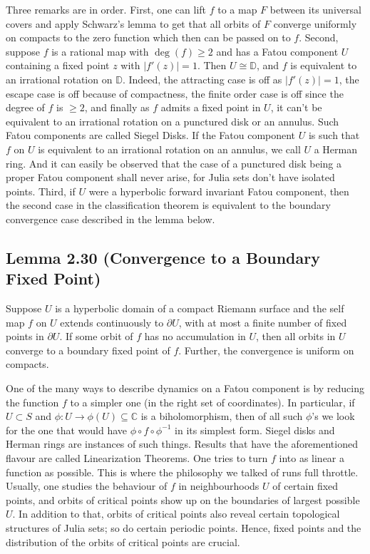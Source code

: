 \documentclass[11pt,a4paper]{article}
\begin{document}
        Three remarks are in order. First, one can lift $f$ to a map $F$ between its universal covers and apply Schwarz's lemma to get that all orbits of $F$ converge uniformly on compacts to the zero function which then can be passed on to $f$. Second, suppose $f$ is a rational map with $\deg(f)\geq2$ and has a Fatou component $U$ containing a fixed point $z$ with $|f'(z)|=1$. Then $U \cong \mathbb{D}$, and $f$ is equivalent to an irrational rotation on $\mathbb{D}$. Indeed, the attracting case is off as $|f'(z)| = 1$, the escape case is off because of compactness, the finite order case is off since the degree of $f$ is $\geq 2$, and finally as $f$ admits a fixed point in $U$, it can't be equivalent to an irrational rotation on a punctured disk or an annulus.
        Such Fatou components are called Siegel Disks. If the Fatou component $U$ is such that $f$ on $U$ is equivalent to an irrational rotation on an annulus, we call $U$ a Herman ring. And it can easily be observed that the case of a punctured disk being a proper Fatou component shall never arise, for Julia sets don't have isolated points. Third, if $U$ were a hyperbolic forward invariant Fatou component, then the second case in the classification theorem is equivalent to the boundary convergence case described in the lemma below.

        \subsection*{Lemma 2.30 (Convergence to a Boundary Fixed Point)} Suppose $U$ is a hyperbolic domain of a compact Riemann surface and the self map $f$ on $U$ extends continuously to $\partial U$, with at most a finite number of fixed points in $\partial U$. If some orbit of $f$ has no accumulation in $U$, then all orbits in $U$ converge to a boundary fixed point of $f$. Further, the convergence is uniform on compacts.


        One of the many ways to describe dynamics on a Fatou component is by reducing the function $f$ to a simpler one (in the right set of coordinates). In particular, if $U\subset S$ and $\phi: U \rightarrow \phi(U) \subseteq \mathbb{C}$ is a biholomorphism, then of all such $\phi$'s we look for the one that would have $\phi \circ f \circ \phi^{-1}$ in its simplest form. Siegel disks and Herman rings are instances of such things. Results that have the aforementioned flavour are called Linearization Theorems. One tries to turn $f$ into as linear a function as possible. This is where the philosophy we talked of runs full throttle. Usually, one studies the behaviour of $f$ in neighbourhoods $U$ of certain fixed points, and orbits of critical points show up on the boundaries of largest possible $U$. In addition to that, orbits of critical points also reveal certain topological structures of Julia sets; so do certain periodic points. Hence, fixed points and the distribution of the orbits of critical points are crucial.
\end{document}
